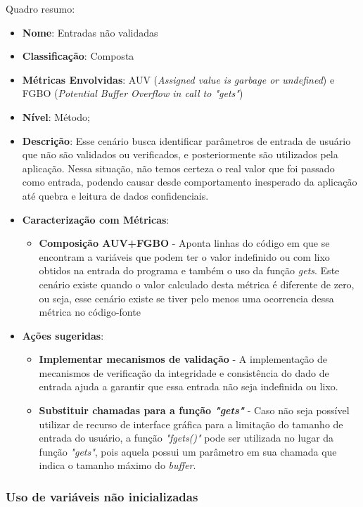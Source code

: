 Quadro resumo:

\begin{itemize}
\item \textbf{Nome}: Entradas não validadas
\item \textbf{Classificação}: Composta
\item \textbf{Métricas Envolvidas}: AUV (\emph{Assigned value is garbage or undefined}) e FGBO (\emph{Potential Buffer Overflow in call to "gets"}) 
\item \textbf{Nível}: Método;
\item \textbf{Descrição}: Esse cenário busca identificar parâmetros de entrada de usuário que não são validados ou verificados, e posteriormente são utilizados pela aplicação. Nessa situação, não temos certeza o real valor que foi passado como entrada, podendo causar desde comportamento inesperado da aplicação até quebra e leitura de dados confidenciais.
\item \textbf{Caracterização com Métricas}: 
	\begin{itemize}
	\item \textbf{Composição AUV+FGBO} - Aponta linhas do código em que se encontram a variáveis que podem ter o valor indefinido ou com lixo obtidos na entrada do programa e também o uso da função \emph{gets}. Este cenário existe quando o valor calculado desta métrica é diferente de zero, ou seja, esse cenário existe se tiver pelo menos uma ocorrencia dessa métrica no código-fonte
	\end{itemize}
\item \textbf{Ações sugeridas}: 
	\begin{itemize}
	\item \textbf{Implementar mecanismos de validação} - A implementação de mecanismos de verificação da integridade e consistência do dado de entrada ajuda a garantir que essa entrada não seja indefinida ou lixo.
	\item \textbf{Substituir chamadas para a função \emph{"gets"}} - Caso não seja possível utilizar de recurso de interface gráfica para a limitação do tamanho de entrada do usuário,  a função \emph{"fgets()"} pode ser utilizada no lugar da função  \emph{"gets"}, pois aquela possui um parâmetro em sua chamada que indica o tamanho máximo do \emph{buffer}. 
	\end{itemize}
\end{itemize}

\subsubsection{Uso de variáveis não inicializadas}

